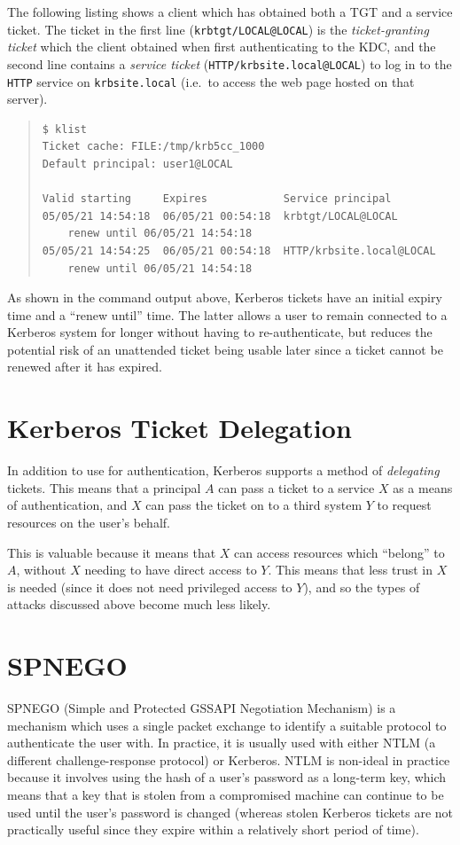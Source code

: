 \documentclass[12pt]{report}
\begin{document}
The following listing shows a client which has obtained both a TGT and a service ticket. The ticket in the first line (\verb+krbtgt/LOCAL@LOCAL+) is the \textit{ticket-granting ticket} which the client obtained when first authenticating to the KDC, and the second line contains a \textit{service ticket} (\verb+HTTP/krbsite.local@LOCAL+) to log in to the \verb+HTTP+ service on \verb+krbsite.local+ (i.e.\ to access the web page hosted on that server).

\begin{quote}
\begin{verbatim}
$ klist
Ticket cache: FILE:/tmp/krb5cc_1000
Default principal: user1@LOCAL

Valid starting     Expires            Service principal
05/05/21 14:54:18  06/05/21 00:54:18  krbtgt/LOCAL@LOCAL
	renew until 06/05/21 14:54:18
05/05/21 14:54:25  06/05/21 00:54:18  HTTP/krbsite.local@LOCAL
	renew until 06/05/21 14:54:18
\end{verbatim}
\end{quote}

As shown in the command output above, Kerberos tickets have an initial expiry time and a ``renew until'' time. The latter allows a user to remain connected to a Kerberos system for longer without having to re-authenticate, but reduces the potential risk of an unattended ticket being usable later since a ticket cannot be renewed after it has expired.

\section{Kerberos Ticket Delegation}
In addition to use for authentication, Kerberos supports a method of \textit{delegating} tickets. This means that a principal $A$ can pass a ticket to a service $X$ as a means of authentication, and $X$ can pass the ticket on to a third system $Y$ to request resources on the user's behalf.

This is valuable because it means that $X$ can access resources which ``belong'' to $A$, without $X$ needing to have direct access to $Y$. This means that less trust in $X$ is needed (since it does not need privileged access to $Y$), and so the types of attacks discussed above become much less likely.

\section{SPNEGO}
SPNEGO (Simple and Protected GSSAPI Negotiation Mechanism) is a mechanism which uses a single packet exchange to identify a suitable protocol to authenticate the user with. In practice, it is usually used with either NTLM (a different challenge-response protocol) or Kerberos. NTLM is non-ideal in practice because it involves using the hash of a user's password as a long-term key, which means that a key that is stolen from a compromised machine can continue to be used until the user's password is changed (whereas stolen Kerberos tickets are not practically useful since they expire within a relatively short period of time).
\end{document}
